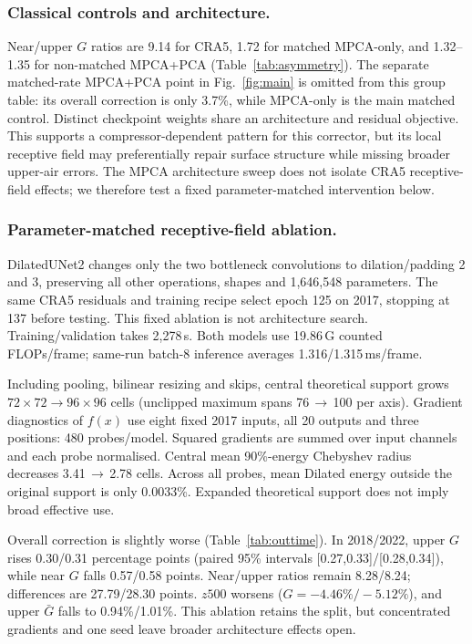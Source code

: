 \subsubsection{Classical controls and architecture.}
Near/upper $G$ ratios are 9.14 for CRA5, 1.72 for matched MPCA-only, and
1.32--1.35 for non-matched MPCA+PCA (Table~\ref{tab:asymmetry}). The separate
matched-rate MPCA+PCA point in Fig.~\ref{fig:main} is omitted from this group
table: its overall correction is only 3.7\%, while MPCA-only is the main matched
control. Distinct checkpoint weights share an architecture and residual objective. This supports
a compressor-dependent pattern for this corrector, but its local receptive field
may preferentially repair surface structure while missing broader upper-air
errors. The MPCA architecture sweep does not isolate CRA5 receptive-field effects;
we therefore test a fixed parameter-matched intervention below.

\subsubsection{Parameter-matched receptive-field ablation.}
DilatedUNet2 changes only the two bottleneck convolutions to dilation/padding
2 and 3, preserving all other operations, shapes and 1{,}646{,}548 parameters.
The same CRA5 residuals and training recipe select epoch 125 on 2017, stopping
at 137 before testing. This fixed ablation is not architecture search.
Training/validation takes 2{,}278\,s. Both models use 19.86\,G counted
FLOPs/frame; same-run batch-8 inference averages 1.316/1.315\,ms/frame.

Including pooling, bilinear resizing and skips, central theoretical support
grows $72\times72\to96\times96$ cells (unclipped maximum spans 76\,$\to$\,100
per axis). Gradient diagnostics of $f(x)$ use eight fixed 2017 inputs, all 20
outputs and three positions: 480 probes/model. Squared gradients are summed
over input channels and each probe normalised. Central mean 90\%-energy Chebyshev radius decreases
3.41\,$\to$\,2.78 cells. Across all probes, mean Dilated energy outside the
original support is only 0.0033\%. Expanded theoretical support does not imply broad effective use.

Overall correction is slightly worse (Table~\ref{tab:outtime}). In 2018/2022,
upper $G$ rises 0.30/0.31 percentage points (paired 95\% intervals [0.27,0.33]/[0.28,0.34]),
while near $G$ falls 0.57/0.58 points. Near/upper ratios remain 8.28/8.24;
differences are 27.79/28.30 points. $z500$ worsens ($G=-4.46\%/-5.12\%$),
and upper $\bar G$ falls to 0.94\%/1.01\%. This ablation retains the split,
but concentrated gradients and one seed leave broader architecture effects open.

